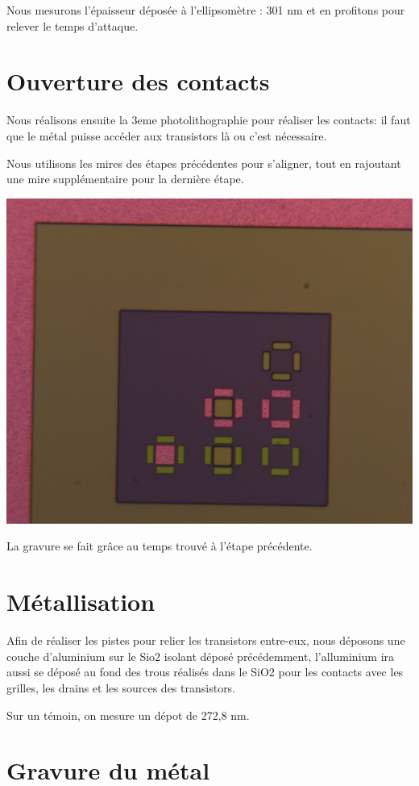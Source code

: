 \documentclass{article}
\begin{document}
Nous mesurons l’épaisseur déposée à l’ellipsomètre : 301 nm et en profitons pour relever le temps d’attaque.

\section{Ouverture des contacts}

Nous réalisons ensuite la 3eme photolithographie pour réaliser les contacts: il faut que le métal puisse accéder aux transistors là ou c’est nécessaire.

Nous utilisons les mires des étapes précédentes pour s'aligner, tout en rajoutant une mire supplémentaire pour la dernière étape.

\includegraphics[width=\linewidth]{mire_contacts.png}

La gravure se fait grâce au temps trouvé à l’étape précédente.

\section{Métallisation}

Afin de réaliser les pistes pour relier les transistors entre-eux, nous déposons une couche d'aluminium sur le Sio2 isolant déposé précédemment, l’alluminium ira aussi se déposé au fond des trous réalisés dans le SiO2 pour les contacts avec les grilles, les drains et les sources des transistors.

Sur un témoin, on mesure un dépot de 272,8 nm.

\section{Gravure du métal}
\end{document}
